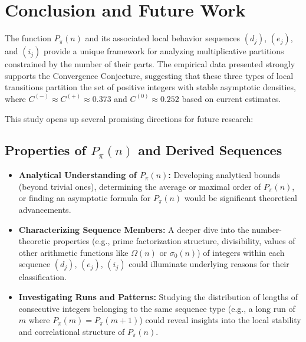 \documentclass[]{article}
\theoremstyle{plain}%
\theoremstyle{definition}
\theoremstyle{remark}
\begin{document}
\section{Conclusion and Future Work}
\label{sec:conclusion}

The function $P_{\pi}(n)$ and its associated local behavior sequences $(d_j)$, $(e_j)$, and $(i_j)$ provide a unique framework for analyzing multiplicative partitions constrained by the number of their parts. The empirical data presented strongly supports the Convergence Conjecture, suggesting that these three types of local transitions partition the set of positive integers with stable asymptotic densities, where $C^{(-)} \approx C^{(+)} \approx 0.373$ and $C^{(0)} \approx 0.252$ based on current estimates.

This study opens up several promising directions for future research:

\subsection{Properties of $P_{\pi}(n)$ and Derived Sequences}
\begin{itemize}
	\item \textbf{Analytical Understanding of $P_{\pi}(n)$:} Developing analytical bounds (beyond trivial ones), determining the average or maximal order of $P_{\pi}(n)$, or finding an asymptotic formula for $P_{\pi}(n)$ would be significant theoretical advancements.
	\item \textbf{Characterizing Sequence Members:} A deeper dive into the number-theoretic properties (e.g., prime factorization structure, divisibility, values of other arithmetic functions like $\Omega(n)$ or $\sigma_0(n)$) of integers within each sequence $(d_j)$, $(e_j)$, $(i_j)$ could illuminate underlying reasons for their classification.
	\item \textbf{Investigating Runs and Patterns:} Studying the distribution of lengths of consecutive integers belonging to the same sequence type (e.g., a long run of $m$ where $P_{\pi}(m) = P_{\pi}(m+1)$) could reveal insights into the local stability and correlational structure of $P_{\pi}(n)$.
\end{itemize}
\end{document}
